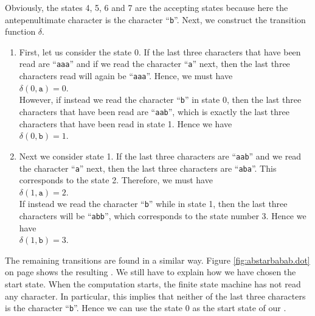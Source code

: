 Obviously, the states 4, 5, 6 and 7 are the accepting states because here the antepenultimate
character is the character ``\texttt{b}''.  Next, we construct the transition function $\delta$.
\begin{enumerate}
\item[0.] First, let us consider the state 0.  If the last three characters that have been read are
          ``\texttt{aaa}'' and if we read the character ``\texttt{a}'' next, then the last three
          characters read will again be ``\texttt{aaa}''.  Hence, we must have
          \\[0.2cm]
          \hspace*{1.3cm}
          $\delta(0, \mathtt{a}) = 0$.
          \\[0.2cm]
          However, if instead we read the character ``\texttt{b}'' in state 0, then the last three
          characters that have been read are ``\texttt{aab}'', which is exactly the last three
          characters that have been read in state 1.  Hence we have
          \\[0.2cm]
          \hspace*{1.3cm}
          $\delta(0, \mathtt{b}) = 1$.
\item[1.] Next we consider state 1.  If the last three characters are ``\texttt{aab}'' and we read
          the character ``\texttt{a}'' next, then the last three characters are ``\texttt{aba}''.
          This corresponds to the state  2.  Therefore, we must have
          \\[0.2cm]
          \hspace*{1.3cm}
          $\delta(1, \mathtt{a}) = 2$.
          \\[0.2cm]
          If instead we read the character  ``\texttt{b}'' while in state 1, then the last three
          characters will be ``\texttt{abb}'', which corresponds to the state number  3.  Hence we have
          \\[0.2cm]
          \hspace*{1.3cm}
          $\delta(1, \mathtt{b}) = 3$.
\end{enumerate}
The remaining transitions are found in a similar way.
Figure \ref{fig:abstarbabab.dot} on page \pageref{fig:abstarbabab.dot} shows the resulting .
We still have to explain how we have chosen the start state.  When the computation starts, the
finite state machine has not read any character.  In particular, this implies that neither of the
last three characters is the character ``\texttt{b}''.   Hence we can use the state 0 as the start
state of our .

